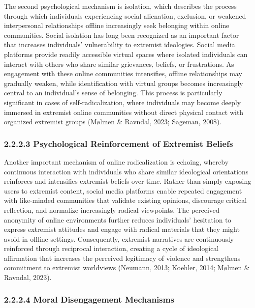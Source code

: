 \documentclass[10pt]{NSP1}
\begin{document}
	The second psychological mechanism is isolation, which describes the process through which individuals experiencing social alienation, exclusion, or weakened interpersonal relationships offline increasingly seek belonging within online communities. Social isolation has long been recognized as an important factor that increases individuals' vulnerability to extremist ideologies. Social media platforms provide readily accessible virtual spaces where isolated individuals can interact with others who share similar grievances, beliefs, or frustrations. As engagement with these online communities intensifies, offline relationships may gradually weaken, while identification with virtual groups becomes increasingly central to an individual's sense of belonging. This process is particularly significant in cases of self-radicalization, where individuals may become deeply immersed in extremist online communities without direct physical contact with organized extremist groups (M\o lmen \& Ravndal, 2023; Sageman, 2008).
	
	\subsubsection*{2.2.2.3 Psychological Reinforcement of Extremist Beliefs}
	
	Another important mechanism of online radicalization is echoing, whereby continuous interaction with individuals who share similar ideological orientations reinforces and intensifies extremist beliefs over time. Rather than simply exposing users to extremist content, social media platforms enable repeated engagement with like-minded communities that validate existing opinions, discourage critical reflection, and normalize increasingly radical viewpoints. The perceived anonymity of online environments further reduces individuals' hesitation to express extremist attitudes and engage with radical materials that they might avoid in offline settings. Consequently, extremist narratives are continuously reinforced through reciprocal interaction, creating a cycle of ideological affirmation that increases the perceived legitimacy of violence and strengthens commitment to extremist worldviews (Neumann, 2013; Koehler, 2014; M\o lmen \& Ravndal, 2023).
	
	\subsubsection*{2.2.2.4 Moral Disengagement Mechanisms}
	
\end{document}
